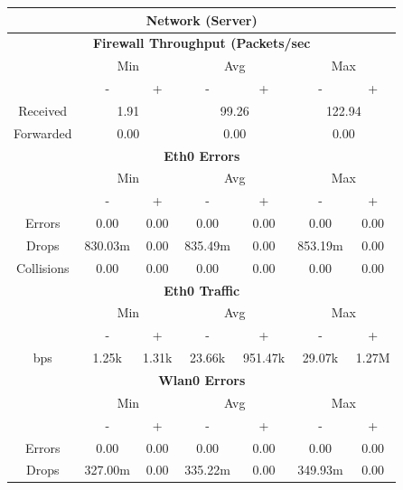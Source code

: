 \documentclass[11pt,a4paper]{scrreprt}
\begin{document}
\begin{table}[H]
\centering
    \begin{tabular}{||c|c|c|c|c|c|c||}
    \hline
    \multicolumn{7}{|c|}{\textbf{Network (Server)}} \\
    \hline
    \multicolumn{7}{|c|}{\textbf{Firewall Throughput (Packets/sec}} \\
    \hline\hline
      & \multicolumn{2}{|c|}{Min} & \multicolumn{2}{|c|}{Avg} & \multicolumn{2}{|c|}{Max} \\
    \hline
      & - & + & - & + & - & + \\
    \hline
    Received & \multicolumn{2}{|c|}{1.91} & \multicolumn{2}{|c|}{99.26} & \multicolumn{2}{|c|}{122.94} \\
    \hline
    Forwarded & \multicolumn{2}{|c|}{0.00} & \multicolumn{2}{|c|}{0.00} & \multicolumn{2}{|c|}{0.00} \\
    \hline\hline
    \multicolumn{7}{|c|}{\textbf{Eth0 Errors}} \\
    \hline\hline
      & \multicolumn{2}{|c|}{Min} & \multicolumn{2}{|c|}{Avg} & \multicolumn{2}{|c|}{Max} \\
    \hline
     & - & + & - & + & - & + \\
    \hline
    Errors & 0.00 & 0.00 & 0.00 & 0.00 & 0.00 & 0.00 \\
    \hline
    Drops & 830.03m & 0.00 & 835.49m & 0.00 & 853.19m & 0.00 \\
    \hline
    Collisions & 0.00 & 0.00 & 0.00 & 0.00 & 0.00 & 0.00 \\
    \hline\hline
    \multicolumn{7}{|c|}{\textbf{Eth0 Traffic}} \\
    \hline\hline
      & \multicolumn{2}{|c|}{Min} & \multicolumn{2}{|c|}{Avg} & \multicolumn{2}{|c|}{Max} \\
    \hline
      & - & + & - & + & - & + \\
    \hline
    bps & 1.25k & 1.31k & 23.66k & 951.47k & 29.07k & 1.27M \\
    \hline\hline
    \multicolumn{7}{|c|}{\textbf{Wlan0 Errors}} \\
    \hline\hline
      & \multicolumn{2}{|c|}{Min} & \multicolumn{2}{|c|}{Avg} & \multicolumn{2}{|c|}{Max} \\
    \hline
      & - & + & - & + & - & + \\
    \hline
    Errors  & 0.00 & 0.00 & 0.00 & 0.00 & 0.00 & 0.00 \\
    \hline
    Drops & 327.00m & 0.00 & 335.22m & 0.00 & 349.93m & 0.00 \\

\end{tabular}
\end{table}
\end{document}

